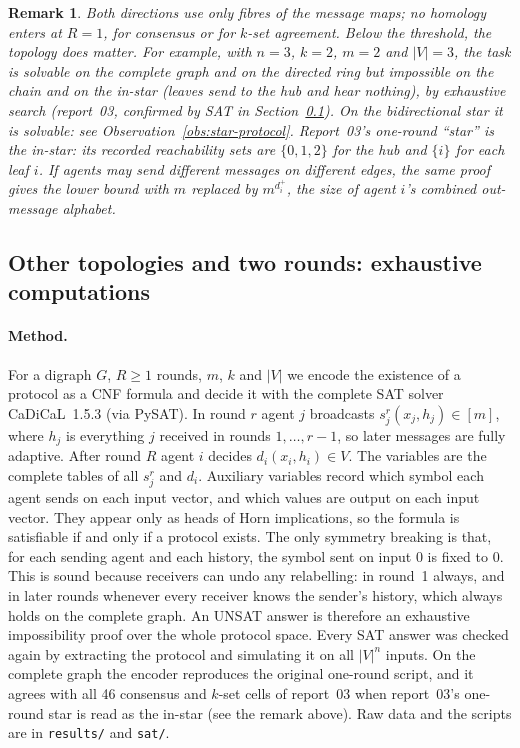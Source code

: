 \documentclass[11pt]{article}
\newtheorem{remark}[theorem]{Remark}
\begin{document}
\begin{remark}
Both directions use only fibres of the message maps; no homology enters at $R=1$, for consensus or for $k$-set agreement. Below the threshold, the topology does matter. For example, with $n=3$, $k=2$, $m=2$ and $|V|=3$, the task is solvable on the complete graph and on the directed ring but impossible on the chain and on the \emph{in-star} (leaves send to the hub and hear nothing), by exhaustive search (report~03, confirmed by SAT in Section~\ref{sec:kset-computations}). On the \emph{bidirectional} star it is solvable: see Observation~\ref{obs:star-protocol}. Report~03's one-round ``star'' is the in-star: its recorded reachability sets are $\{0,1,2\}$ for the hub and $\{i\}$ for each leaf $i$. If agents may send different messages on different edges, the same proof gives the lower bound with $m$ replaced by $m^{d^+_i}$, the size of agent $i$'s combined out-message alphabet.
\end{remark}

\subsection{Other topologies and two rounds: exhaustive computations}\label{sec:kset-computations}

\paragraph{Method.} For a digraph $G$, $R\ge1$ rounds, $m$, $k$ and $|V|$ we encode the existence of a protocol as a CNF formula and decide it with the complete SAT solver CaDiCaL~1.5.3 (via PySAT). In round $r$ agent $j$ broadcasts $s^r_j(x_j,h_j)\in[m]$, where $h_j$ is everything $j$ received in rounds $1,\dots,r-1$, so later messages are fully adaptive. After round $R$ agent $i$ decides $d_i(x_i,h_i)\in V$. The variables are the complete tables of all $s^r_j$ and $d_i$. Auxiliary variables record which symbol each agent sends on each input vector, and which values are output on each input vector. They appear only as heads of Horn implications, so the formula is satisfiable if and only if a protocol exists. The only symmetry breaking is that, for each sending agent and each history, the symbol sent on input $0$ is fixed to $0$. This is sound because receivers can undo any relabelling: in round~1 always, and in later rounds whenever every receiver knows the sender's history, which always holds on the complete graph. An UNSAT answer is therefore an exhaustive impossibility proof over the whole protocol space. Every SAT answer was checked again by extracting the protocol and simulating it on all $|V|^n$ inputs. On the complete graph the encoder reproduces the original one-round script, and it agrees with all 46 consensus and $k$-set cells of report~03 when report~03's one-round star is read as the in-star (see the remark above). Raw data and the scripts are in \texttt{results/} and \texttt{sat/}.
\end{document}
